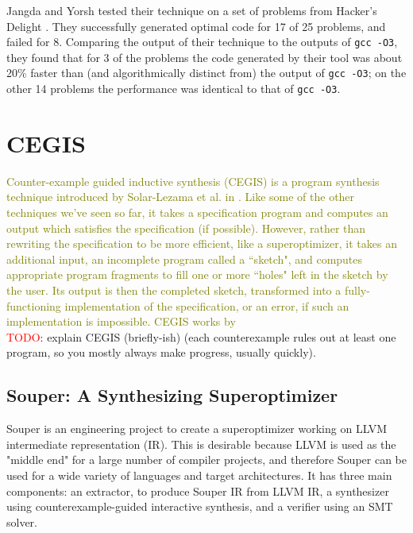 \documentclass[12pt,twoside]{reedthesis}
\newcommand{\red}[1]{\textcolor{red}{#1}}
\newcommand{\green}[1]{\textcolor{olive}{#1}}
\begin{document}
            Jangda and Yorsh tested their technique on a set of problems from Hacker's Delight \cite{warren2013hackers}.
            They successfully generated optimal code for 17 of 25 problems, and failed for 8.
            Comparing the output of their technique to the outputs of \texttt{gcc -O3}\footnotemark, they found that for 3 of the problems the code generated by their tool was about 20\% faster than (and algorithmically distinct from) the output of \texttt{gcc -O3}; on the other 14 problems the performance was identical to that of \texttt{gcc -O3}.


    \section{CEGIS}
        \green{
        Counter-example guided inductive synthesis (CEGIS) is a program synthesis technique introduced by Solar-Lezama et al. in \cite{solar-lezama2006sketch}.
        Like some of the other techniques we've seen so far, it takes a specification program and computes an output which satisfies the specification (if possible).
        However, rather than rewriting the specification to be more efficient, like a superoptimizer, it takes an additional input, an incomplete program called a ``sketch", and computes appropriate program fragments to fill one or more ``holes" left in the sketch by the user.
        Its output is then the completed sketch, transformed into a fully-functioning implementation of the specification, or an error, if such an implementation is impossible.
        CEGIS works by 
        }
        \\  \red{TODO}: explain CEGIS (briefly-ish) (each counterexample rules out at least one program, so you mostly always make progress, usually quickly).

        \subsection{Souper: A Synthesizing Superoptimizer}
            Souper \cite{sasnauskas2017souper} is an engineering project to create a superoptimizer working on LLVM intermediate representation (IR).
            This is desirable because LLVM is used as the "middle end" for a large number of compiler projects, and therefore Souper can be used for a wide variety of languages and target architectures.
            It has three main components:
                an extractor, to produce Souper IR from LLVM IR,
                a synthesizer using counterexample-guided interactive synthesis,
                and a verifier using an SMT solver.
            
\end{document}
